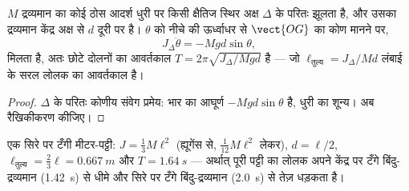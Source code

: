 \begin{proposition}[भौतिक लोलक]\label{prop:b2:rigid-body-mechanics:pendulum}
$M$ द्रव्यमान का कोई ठोस आदर्श धुरी पर किसी क्षैतिज स्थिर अक्ष $\Delta$
के परितः झूलता है, और उसका द्रव्यमान केंद्र अक्ष से $d$ दूरी पर है।
$\theta$ को नीचे की ऊर्ध्वाधर से $\vect{OG}$ का कोण मानने पर,
\[
J_\Delta\ddot\theta = -Mgd\sin\theta ,
\]
मिलता है, अतः छोटे दोलनों का आवर्तकाल $T = 2\pi\sqrt{J_\Delta/Mgd}$ है
--- जो $\ell_{\text{तुल्य}} = J_\Delta/Md$ लंबाई के सरल लोलक का आवर्तकाल है।
\end{proposition}

\begin{proof}
$\Delta$ के परितः कोणीय संवेग प्रमेय: भार का आघूर्ण
$-Mgd\sin\theta$ है, धुरी का शून्य। अब रैखिकीकरण कीजिए।
\end{proof}

\begin{example}[मीटर-पट्टी]\label{ex:b2:rigid-body-mechanics:rule}
एक सिरे पर टँगी मीटर-पट्टी: $J = \tfrac13M\ell^2$ (ह्यूगेंस से,
$\tfrac1{12}M\ell^2$ लेकर), $d = \ell/2$, $\ell_{\text{तुल्य}} = \tfrac23\ell =
\qty{0.667}{m}$ और $T = \qty{1.64}{s}$ --- अर्थात् पूरी पट्टी का लोलक अपने
केंद्र पर टँगे बिंदु-द्रव्यमान (\qty{1.42}{s}) से धीमे और सिरे पर टँगे
बिंदु-द्रव्यमान (\qty{2.0}{s}) से तेज़ धड़कता है।
\end{example}

